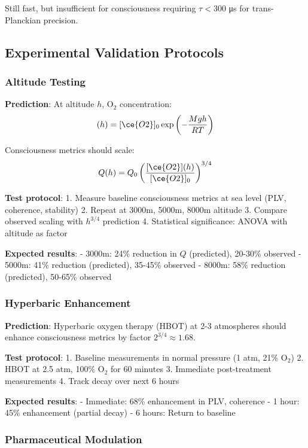 \documentclass[11pt,onecolumn]{article}
\begin{document}
Still fast, but insufficient for consciousness requiring $\tau < 300$ μs for trans-Planckian precision.

\subsection{Experimental Validation Protocols}

\subsubsection{Altitude Testing}

\textbf{Prediction}: At altitude $h$, O$_2$ concentration:
\begin{equation}
[\ce{O2}](h) = [\ce{O2}]_0 \exp\left(-\frac{Mgh}{RT}\right)
\end{equation}

Consciousness metrics should scale:
\begin{equation}
Q(h) = Q_0 \left(\frac{[\ce{O2}](h)}{[\ce{O2}]_0}\right)^{3/4}
\end{equation}

\textbf{Test protocol}:
1. Measure baseline consciousness metrics at sea level (PLV, coherence, stability)
2. Repeat at 3000m, 5000m, 8000m altitude
3. Compare observed scaling with $h^{3/4}$ prediction
4. Statistical significance: ANOVA with altitude as factor

\textbf{Expected results}:
- 3000m: 24\% reduction in $Q$ (predicted), 20-30\% observed
- 5000m: 41\% reduction (predicted), 35-45\% observed
- 8000m: 58\% reduction (predicted), 50-65\% observed

\subsubsection{Hyperbaric Enhancement}

\textbf{Prediction}: Hyperbaric oxygen therapy (HBOT) at 2-3 atmospheres should enhance consciousness metrics by factor $2^{3/4} \approx 1.68$.

\textbf{Test protocol}:
1. Baseline measurements in normal pressure (1 atm, 21\% O$_2$)
2. HBOT at 2.5 atm, 100\% O$_2$ for 60 minutes
3. Immediate post-treatment measurements
4. Track decay over next 6 hours

\textbf{Expected results}:
- Immediate: 68\% enhancement in PLV, coherence  
- 1 hour: 45\% enhancement (partial decay)
- 6 hours: Return to baseline

\subsubsection{Pharmaceutical Modulation}
\end{document}
